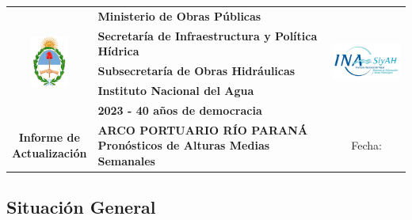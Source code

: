 \documentclass[11pt,spanish,a4paper] {article}
\DeclareRobustCommand{\fechaformat}{}
\DeclareRobustCommand{\situaciongeneral}{}
\begin{document}
\captionsetup{labelformat=empty}
\begingroup
\begin{center}
\renewcommand{\arraystretch}{0.8}
\begin{tabularx}{\textwidth}{|c|>{\centering\arraybackslash}X|c|}
	\hline
	\multirow{5}{*}{\includegraphics[height=1.7cm]{escudo_argentina.png}} & \textbf{\small{Ministerio de Obras Públicas}} & \multirow{5}{*}{\includegraphics[width=2.6cm,height=1.3cm]{logo_ina_crop.png}}  \\
	& \textbf{\small{Secretaría de Infraestructura y Política Hídrica}} & \\
	& \textbf{\small{Subsecretaría de Obras Hidráulicas}} & \\
	& \textbf{\small{Instituto Nacional del Agua}} & \\ 
	& \textbf{\small{2023 - 40 años de democracia}} & \\ 
	\hline
	   \makecell{\large{\textbf{Informe de}} \\ \large{\textbf{Actualización}}} &  \makecell{\large{\textbf{ARCO PORTUARIO RÍO PARANÁ}}  \\ \textbf{Pronósticos de Alturas Medias Semanales}} & Fecha: \fechaformat \\
	\hline
\end{tabularx}
\end{center}
\endgroup
\subsection*{Situación General}
\situaciongeneral
\end{document}
